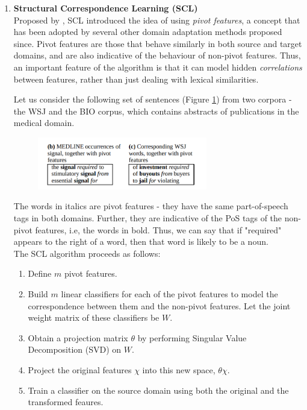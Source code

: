 \documentclass[12pt]{report}
\begin{document}
\begin{enumerate}
		\item \textbf{Structural Correspondence Learning (SCL)} \\
		Proposed by \citep{blitzer2006domain}, SCL introduced the idea of using \textit{pivot features}, a concept that has been adopted by several other domain adaptation methods proposed since. Pivot features are those that behave similarly in both source and target domains, and are also indicative of the behaviour of non-pivot features. Thus, an important feature of the algorithm is that it can model hidden \textit{correlations} between features, rather than just dealing with lexical similarities. 
		\par Let us consider the following set of sentences (Figure \ref{Fig1}) from two corpora - the WSJ and the BIO corpus, which contains abstracts of publications in the medical domain. 
		\begin{figure}[h]
			\caption{}
			\label{Fig1}
			\centering
			\includegraphics[width=0.7\textwidth]{pivot}
		\end{figure}
	
	   The words in italics are pivot features - they have the same part-of-speech tags in both domains. Further, they are indicative of the PoS tags of the non-pivot features, i.e, the words in bold. Thus, we can say that if "required" appears to the right of a word, then that word is likely to be a noun. \\
	   The SCL algorithm proceeds as follows:
	   \begin{enumerate}
	   	\item Define $m$ pivot features.
	   	\item Build $m$ linear classifiers for each of the pivot features to model the correspondence between them and the non-pivot features. Let the joint weight matrix of these classifiers be $W$.
	   	\item Obtain a projection matrix $\theta$ by performing Singular Value Decomposition (SVD) on $W$. 
	   	\item Project the original features $\chi$ into this new space, $\theta\chi$. 
	   	\item Train a classifier on the source domain using both the original and the transformed feaures.
	   \end{enumerate}
   

\end{enumerate}
\end{document}
